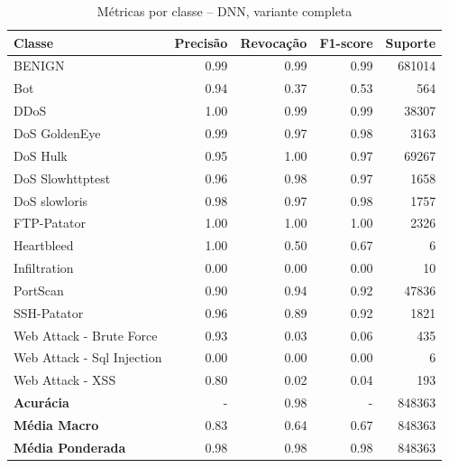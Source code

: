 \begin{table}[H]
    \centering
    \small
    \begin{tabular}{lrrrr}
        \hline
        Classe                     & Precisão & Revocação & F1-score & Suporte \\
        \hline
        BENIGN                     & 0.99     & 0.99      & 0.99     & 681014  \\
        Bot                        & 0.94     & 0.37      & 0.53     & 564     \\
        DDoS                       & 1.00     & 0.99      & 0.99     & 38307   \\
        DoS GoldenEye              & 0.99     & 0.97      & 0.98     & 3163    \\
        DoS Hulk                   & 0.95     & 1.00      & 0.97     & 69267   \\
        DoS Slowhttptest           & 0.96     & 0.98      & 0.97     & 1658    \\
        DoS slowloris              & 0.98     & 0.97      & 0.98     & 1757    \\
        FTP-Patator                & 1.00     & 1.00      & 1.00     & 2326    \\
        Heartbleed                 & 1.00     & 0.50      & 0.67     & 6       \\
        Infiltration               & 0.00     & 0.00      & 0.00     & 10      \\
        PortScan                   & 0.90     & 0.94      & 0.92     & 47836   \\
        SSH-Patator                & 0.96     & 0.89      & 0.92     & 1821    \\
        Web Attack - Brute Force   & 0.93     & 0.03      & 0.06     & 435     \\
        Web Attack - Sql Injection & 0.00     & 0.00      & 0.00     & 6       \\
        Web Attack - XSS           & 0.80     & 0.02      & 0.04     & 193     \\
        \hline
        \textbf{Acurácia}          & -        & 0.98      & -        & 848363  \\
        \textbf{Média Macro}       & 0.83     & 0.64      & 0.67     & 848363  \\
        \textbf{Média Ponderada}   & 0.98     & 0.98      & 0.98     & 848363  \\
        \hline
    \end{tabular}
    \caption{Métricas por classe -- DNN, variante completa}
    \label{table:dnn_completo_metricas}
\end{table}
